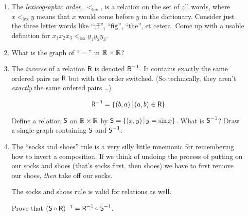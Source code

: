 \begin{enumerate}
\item The \emph{lexicographic order}, 
$<_{\mbox{lex}}$, is a relation on the
set of all words, where $x <_{\mbox{lex}} y$ means that $x$ would come before
$y$ in the dictionary.  Consider just the three letter words like ``iff'',
``fig'', ``the'', et cetera.  Come up with a usable definition for
$x_1x_2x_3  <_{\mbox{lex}} y_1y_2y_3$.

\item What is the graph of ``$=$'' in ${\mathbb R} \times {\mathbb R}$?

\item The  \emph{inverse} of a relation $\mbox{\textsf R}$
is denoted $\mbox{\textsf R}^{-1}$.  It contains exactly the same ordered pairs
as $\mbox{\textsf R}$ but with the order switched.  (So technically, they aren't
\emph{exactly} the same ordered pairs \ldots)

\[ \relR^{-1} = \{ (b,a) \suchthat (a,b) \in \relR \} \]

\noindent Define a relation $\mbox{\textsf S}$ on ${\mathbb R} \times {\mathbb R}$ by
$\relS = \{ (x,y) \suchthat y = \sin x \}$.  What is $\mbox{\textsf S}^{-1}$?
Draw a single graph containing $\mbox{\textsf S}$ and $\mbox{\textsf S}^{-1}$.

\item The ``socks and shoes'' rule is a very silly little mnemonic
for remembering how to invert a composition.  If we think of undoing
the process of putting on our socks and shoes (that's socks first, then
shoes) we have to first remove our shoes, \emph{then} take off our socks.

The socks and shoes rule is valid for relations as well.

Prove that $(\mbox{\textsf S} \circ \mbox{\textsf R})^{-1} = \mbox{\textsf R}^{-1} \circ \mbox{\textsf S}^{-1}$.

\end{enumerate} 

